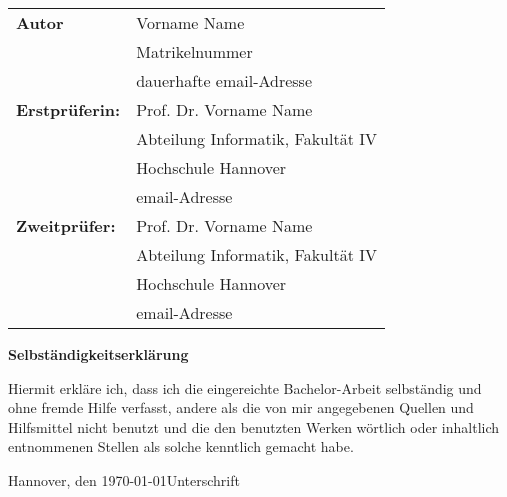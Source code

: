  \newpage \thispagestyle{empty}
 \begin{tabular}{ll}
{\bfseries\sffamily Autor} &  Vorname Name \\ 
            & Matrikelnummer \\
            & dauerhafte email-Adresse \\[5ex]
{\bfseries\sffamily Erstprüferin:} & Prof. Dr. Vorname Name \\
          & Abteilung Informatik, Fakultät IV \\
         & Hochschule Hannover \\
        & email-Adresse \\[5ex]
{\bfseries\sffamily Zweitprüfer:} &Prof. Dr. Vorname Name \\
          & Abteilung Informatik, Fakultät IV \\
         & Hochschule Hannover \\
        & email-Adresse
\end{tabular}

\vfill

\begin{center} \sffamily\bfseries Selbständigkeitserklärung \end{center}

Hiermit erkläre ich, dass ich die eingereichte Bachelor-Arbeit
selbständig und ohne fremde Hilfe verfasst, andere als die von mir angegebenen Quellen
und Hilfsmittel nicht benutzt und die den benutzten Werken wörtlich oder
inhaltlich entnommenen Stellen als solche kenntlich gemacht habe. 
\vspace*{7ex}

Hannover, den \today \hfill Unterschrift
